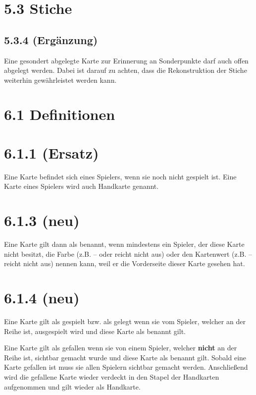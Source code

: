 \section*{5.3 Stiche}

\subsection*{5.3.4 (Ergänzung)}

Eine gesondert abgelegte Karte zur Erinnerung an Sonderpunkte darf auch
offen abgelegt werden. Dabei ist darauf zu achten, dass die
Rekonstruktion der Stiche weiterhin gewährleistet werden kann.

\section*{6.1 Definitionen}

\section*{6.1.1 (Ersatz)}

Eine Karte befindet sich  eines Spielers, wenn sie noch nicht
gespielt ist. Eine Karte  eines Spielers wird auch Handkarte
genannt.

\section*{6.1.3 (neu)}

Eine Karte gilt dann als benannt, wenn mindestens ein Spieler, der diese Karte
nicht besitzt, die Farbe (z.B.  --  oder 
reicht nicht aus) oder den Kartenwert (z.B.  --  reicht
nicht aus) nennen kann, weil er die Vorderseite dieser Karte gesehen hat.

\section*{6.1.4 (neu)}

Eine Karte gilt als gespielt bzw. als gelegt wenn sie vom Spieler, welcher an
der Reihe ist, ausgespielt wird und diese Karte als benannt gilt.

Eine Karte gilt als gefallen wenn sie von einem Spieler, welcher \textbf{nicht}
an der Reihe ist, sichtbar gemacht wurde und diese Karte als benannt gilt.
Sobald eine Karte gefallen ist muss sie allen Spielern sichtbar gemacht werden.
Anschließend wird die gefallene Karte wieder verdeckt in den Stapel der
Handkarten aufgenommen und gilt wieder als Handkarte.

